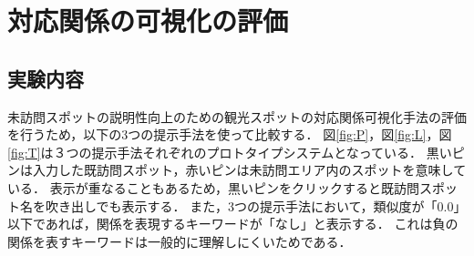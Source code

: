 \documentclass{deimj}
\begin{document}
\section{対応関係の可視化の評価}
\label{sec:対応関係の可視化評価}
\subsection{実験内容}
未訪問スポットの説明性向上のための観光スポットの対応関係可視化手法の評価を行うため，以下の3つの提示手法を使って比較する．
図\ref{fig:P}，図\ref{fig:L}，図\ref{fig:T}は３つの提示手法それぞれのプロトタイプシステムとなっている．
黒いピンは入力した既訪問スポット，赤いピンは未訪問エリア内のスポットを意味している．
表示が重なることもあるため，黒いピンをクリックすると既訪問スポット名を吹き出しでも表示する．
また，3つの提示手法において，類似度が「0.0」以下であれば，関係を表現するキーワードが「なし」と表示する．
これは負の関係を表すキーワードは一般的に理解しにくいためである．
\end{document}
